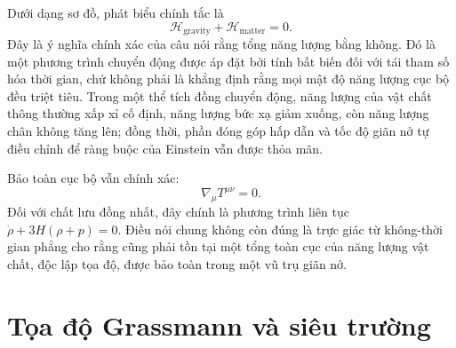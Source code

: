 Dưới dạng sơ đồ, phát biểu chính tắc là
\begin{equation}
\mathcal H_{\mathrm{gravity}}
+\mathcal H_{\mathrm{matter}}
=0.
\end{equation}
Đây là ý nghĩa chính xác của câu nói rằng tổng năng lượng bằng không. Đó là một phương trình chuyển động được áp đặt bởi tính bất biến đối với tái tham số hóa thời gian, chứ không phải là khẳng định rằng mọi mật độ năng lượng cục bộ đều triệt tiêu. Trong một thể tích đồng chuyển động, năng lượng của vật chất thông thường xấp xỉ cố định, năng lượng bức xạ giảm xuống, còn năng lượng chân không tăng lên; đồng thời, phần đóng góp hấp dẫn và tốc độ giãn nở tự điều chỉnh để ràng buộc của Einstein vẫn được thỏa mãn.

Bảo toàn cục bộ vẫn chính xác:
\begin{equation}
\nabla_\mu T^{\mu\nu}=0.
\end{equation}
Đối với chất lưu đồng nhất, đây chính là phương trình liên tục
\(\dot\rho+3H(\rho+p)=0\). Điều nói chung không còn đúng là trực giác từ không-thời gian phẳng cho rằng cũng phải tồn tại một tổng toàn cục của năng lượng vật chất, độc lập tọa độ, được bảo toàn trong một vũ trụ giãn nở.

\begin{classroomqa}
\end{classroomqa}

\section{Tọa độ Grassmann và siêu trường}

\begin{classroomqa}
\end{classroomqa}

